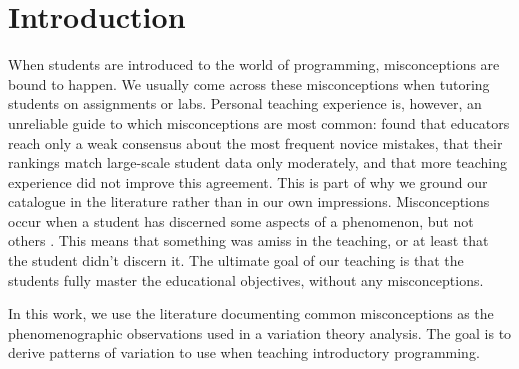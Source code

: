 \mode*
\section{Introduction}

When students are introduced to the world of programming, misconceptions are 
bound to happen.
We usually come across these misconceptions when tutoring students on
assignments or labs.
Personal teaching experience is, however, an unreliable guide to which
misconceptions are most common: \textcite{Brown2014} found that educators reach
only a weak consensus about the most frequent novice mistakes, that their
rankings match large-scale student data only moderately, and that more teaching
experience did not improve this agreement.
This is part of why we ground our catalogue in the literature rather than in our
own impressions.
Misconceptions occur when a student has discerned some aspects of a phenomenon,
but not others \autocite{NCOL}.
This means that something was amiss in the teaching, or at least that the 
student didn't discern it.
The ultimate goal of our teaching is that the students fully master the 
educational objectives, without any misconceptions.


In this work, we use the literature documenting common misconceptions as the 
phenomenographic observations used in a variation theory analysis.
The goal is to derive patterns of variation to use when teaching introductory 
programming.

